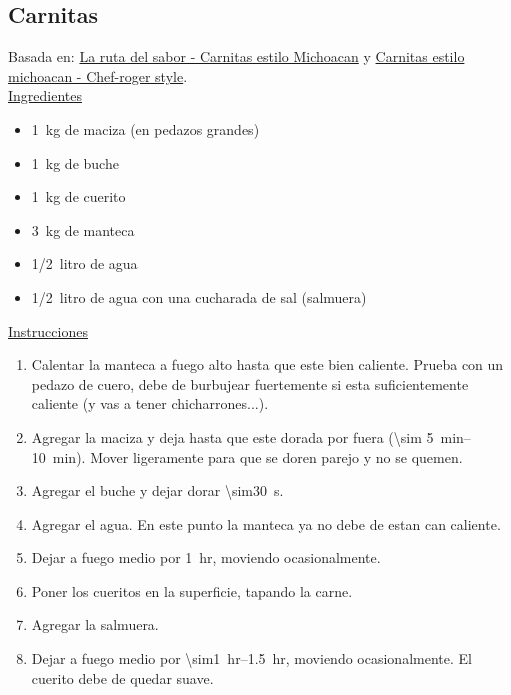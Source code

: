 \subsection{Carnitas}

Basada en: \href{https://www.youtube.com/watch?v=RHBXS7Oo1VM}{La ruta del sabor - Carnitas estilo Michoacan} y \href{https://www.youtube.com/watch?v=3Yz4mSFP9G8}{Carnitas estilo michoacan - Chef-roger style}. \\

\underline{Ingredientes}

\begin{itemize}
\item \SI{1}{kg} de maciza (en pedazos grandes)
\item \SI{1}{kg} de buche
\item \SI{1}{kg} de cuerito
\item \SI{3}{kg} de manteca
\item \SI{1/2}{litro} de agua
\item \SI{1/2}{litro} de agua con una cucharada de sal (salmuera)
\end{itemize}

\underline{Instrucciones}

\begin{enumerate}
\item Calentar la manteca a fuego alto hasta que este bien caliente. Prueba con un pedazo de cuero, debe de burbujear fuertemente si esta suficientemente caliente (y vas a tener chicharrones...).
\item Agregar la maciza y deja hasta que este dorada por fuera (\SIrange{\sim 5}{10}{min}). Mover ligeramente para que se doren parejo y no se quemen.
\item Agregar el buche y dejar dorar \SI{\sim30}{s}.
\item Agregar el agua. En este punto la manteca ya no debe de estan can caliente.
\item Dejar a fuego medio por \SI{1}{hr}, moviendo ocasionalmente. 
\item Poner los cueritos en la superficie, tapando la carne.
\item Agregar la salmuera.
\item Dejar a fuego medio por \SIrange{\sim1}{1.5}{hr}, moviendo ocasionalmente. El cuerito debe de quedar suave.  
\end{enumerate}

